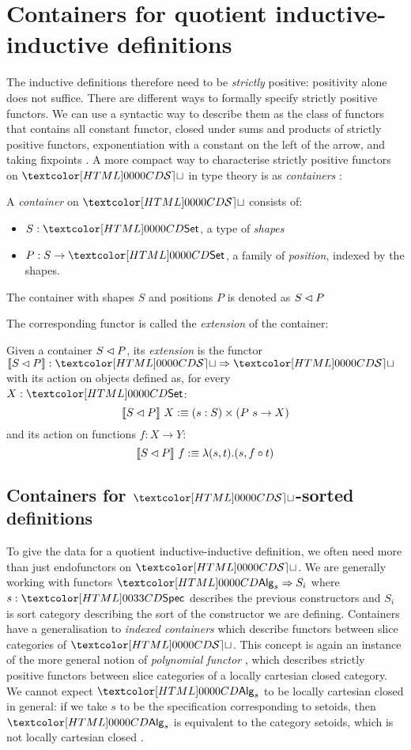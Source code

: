 \chapter{Containers for quotient inductive-inductive definitions}
\label{containers}

The inductive definitions therefore need to be \emph{strictly}
positive: positivity alone does not suffice. There are different ways
to formally specify strictly positive functors. We can use a syntactic
way to describe them as the class of functors that contains all
constant functor, closed under sums and products of strictly positive
functors, exponentiation with a constant on the left of the arrow, and
taking fixpoints \cite{Morris2007}. A more compact way to characterise
strictly positive functors on $\SET$ in type theory is as
\emph{containers} \cite{Abbott2005}:
%
\begin{definition}
\label{def-container}
  A \emph{container} on $\SET$ consists of:
  \begin{itemize}
  \item $S : \Set$, a type of \emph{shapes}
  \item $P : S \to \Set$, a family of \emph{position}, indexed by the shapes.
  \end{itemize}
  The container with shapes $S$ and positions $P$ is denoted as
  $S \lhd P$
\end{definition}
%
The corresponding functor is called the \emph{extension} of the container:
%
\begin{definition}
  Given a container $S \lhd P$, its \emph{extension} is the functor
  $\context{\cont{S}{P}} : \Func{\SET}{\SET}$ with its action on objects
  defined as, for every $X : \Set$:
  $$
  \llbracket S \lhd P \rrbracket\ X :\equiv (s : S) \times (P\ s \to X)
  $$
  and its action on functions $f : X \to Y$:
  $$
  \llbracket S \lhd P \rrbracket\ f :\equiv \lambda (s , t) . (s , f \circ t)
  $$
\end{definition}

\section{Containers for $\SET$-sorted definitions}
To give the data for a quotient inductive-inductive definition, we
often need more than just endofunctors on $\SET$. We are generally
working with functors $\Func{\Alg_s}{S_i}$ where $s : \specty$
describes the previous constructors and $S_i$ is sort category
describing the sort of the constructor we are defining. Containers
have a generalisation to \emph{indexed containers} which describe
functors between slice categories of $\SET$. This concept is again an
instance of the more general notion of \emph{polynomial functor}
\cite{Kock2011}, which describes strictly positive functors between
slice categories of a locally cartesian closed category. We cannot
expect $\Alg_s$ to be locally cartesian closed in general: if we take
$s$ to be the specification corresponding to setoids, then $\Alg_s$ is
equivalent to the category setoids, which is not locally cartesian
closed \cite{Altenkirch2012}.

